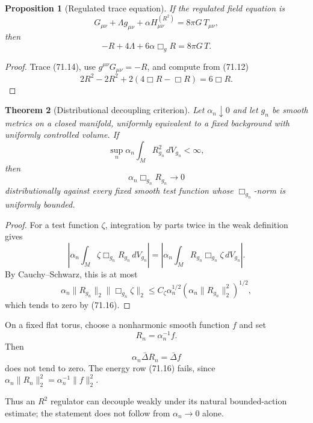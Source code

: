 \documentclass[11pt]{article}
\newtheorem{theorem}{Theorem}[section]
\newtheorem{proposition}[theorem]{Proposition}
\theoremstyle{remark}
\begin{document}
\begin{proposition}[Regulated trace equation]
\label{prop:v15v71-r2-trace}
If the regulated field equation is
\[
 G_{\mu\nu}+\Lambda g_{\mu\nu}
 +\alpha H^{(R^2)}_{\mu\nu}
 =
 8\pi G\,T_{\mu\nu},                                  \tag{71.14}
\]
then
\[
 -R+4\Lambda+6\alpha\Box_gR=8\pi G\,T.                \tag{71.15}
\]
\end{proposition}

\begin{proof}
Trace (71.14), use
\(g^{\mu\nu}G_{\mu\nu}=-R\), and compute from (71.12)
\[
 2R^2-2R^2+2(4\Box R-\Box R)=6\Box R.
\]
\end{proof}

\begin{theorem}[Distributional decoupling criterion]
\label{thm:v15v71-decoupling}
Let \(\alpha_n\downarrow0\) and let \(g_n\) be smooth metrics on a
closed manifold, uniformly equivalent to a fixed background with
uniformly controlled volume.  If
\[
 \sup_n\alpha_n\int_MR_{g_n}^2\,dV_{g_n}<\infty,       \tag{71.16}
\]
then
\[
 \alpha_n\Box_{g_n}R_{g_n}\longrightarrow0            \tag{71.17}
\]
distributionally against every fixed smooth test function whose
\(\Box_{g_n}\)-norm is uniformly bounded.
\end{theorem}

\begin{proof}
For a test function \(\zeta\), integration by parts twice in the
weak definition gives
\[
 \left|
 \alpha_n\int_M\zeta\Box_{g_n}R_{g_n}\,dV_{g_n}
 \right|
 =
 \left|
 \alpha_n\int_MR_{g_n}\Box_{g_n}\zeta\,dV_{g_n}
 \right|.
\]
By Cauchy--Schwarz, this is at most
\[
 \alpha_n
 \|R_{g_n}\|_2
 \|\Box_{g_n}\zeta\|_2
 \leq
 C_\zeta
 \alpha_n^{1/2}
 \left(\alpha_n\|R_{g_n}\|_2^2\right)^{1/2},
\]
which tends to zero by (71.16).
\end{proof}

\begin{counterexample}
\label{cnt:v15v71-decoupling}
On a fixed flat torus, choose a nonharmonic smooth function \(f\)
and set
\[
 R_n=\alpha_n^{-1}f.                                  \tag{71.18}
\]
Then
\[
 \alpha_n\bar\Delta R_n=\bar\Delta f                  \tag{71.19}
\]
does not tend to zero.  The energy row (71.16) fails, since
\(\alpha_n\|R_n\|_2^2=\alpha_n^{-1}\|f\|_2^2\).
\end{counterexample}

Thus an \(R^2\) regulator can decouple weakly under its natural
bounded-action estimate; the statement does not follow from
\(\alpha_n\to0\) alone.
\end{document}
